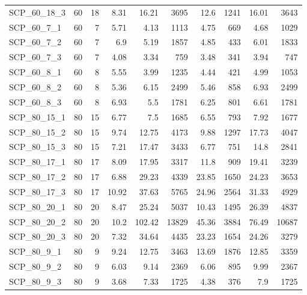 \begin{center}
\begin{scriptsize}
\begin{longtable}{lrrrrrrrrr}
SCP\_60\_18\_3 & 60 & 18 & 8.31 & 16.21 & 3695 & 12.6 & 1241 & 16.01 & 3643\\
SCP\_60\_7\_1 & 60 & 7 & 5.71 & 4.13 & 1113 & 4.75 & 669 & 4.68 & 1029\\
SCP\_60\_7\_2 & 60 & 7 & 6.9 & 5.19 & 1857 & 4.85 & 433 & 6.01 & 1833\\
SCP\_60\_7\_3 & 60 & 7 & 4.08 & 3.34 & 759 & 3.48 & 341 & 3.94 & 747\\
SCP\_60\_8\_1 & 60 & 8 & 5.55 & 3.99 & 1235 & 4.44 & 421 & 4.99 & 1053\\
SCP\_60\_8\_2 & 60 & 8 & 5.36 & 6.15 & 2499 & 5.46 & 858 & 6.93 & 2499\\
SCP\_60\_8\_3 & 60 & 8 & 6.93 & 5.5 & 1781 & 6.25 & 801 & 6.61 & 1781\\
SCP\_80\_15\_1 & 80 & 15 & 6.77 & 7.5 & 1685 & 6.55 & 793 & 7.92 & 1677\\
SCP\_80\_15\_2 & 80 & 15 & 9.74 & 12.75 & 4173 & 9.88 & 1297 & 17.73 & 4047\\
SCP\_80\_15\_3 & 80 & 15 & 7.21 & 17.47 & 3433 & 6.77 & 751 & 14.8 & 2841\\
SCP\_80\_17\_1 & 80 & 17 & 8.09 & 17.95 & 3317 & 11.8 & 909 & 19.41 & 3239\\
SCP\_80\_17\_2 & 80 & 17 & 6.88 & 29.23 & 4339 & 23.85 & 1650 & 24.23 & 3653\\
SCP\_80\_17\_3 & 80 & 17 & 10.92 & 37.63 & 5765 & 24.96 & 2564 & 31.33 & 4929\\
SCP\_80\_20\_1 & 80 & 20 & 8.47 & 25.24 & 5037 & 10.43 & 1495 & 26.39 & 4837\\
SCP\_80\_20\_2 & 80 & 20 & 10.2 & 102.42 & 13829 & 45.36 & 3884 & 76.49 & 10687\\
SCP\_80\_20\_3 & 80 & 20 & 7.32 & 34.64 & 4435 & 23.23 & 1654 & 24.26 & 3279\\
SCP\_80\_9\_1 & 80 & 9 & 9.24 & 12.75 & 3463 & 13.69 & 1876 & 12.85 & 3359\\
SCP\_80\_9\_2 & 80 & 9 & 6.03 & 9.14 & 2369 & 6.06 & 895 & 9.99 & 2367\\
SCP\_80\_9\_3 & 80 & 9 & 3.68 & 7.33 & 1725 & 4.38 & 376 & 7.9 & 1725\\
\bottomrule
\end{longtable}
\end{scriptsize}
\end{center}

